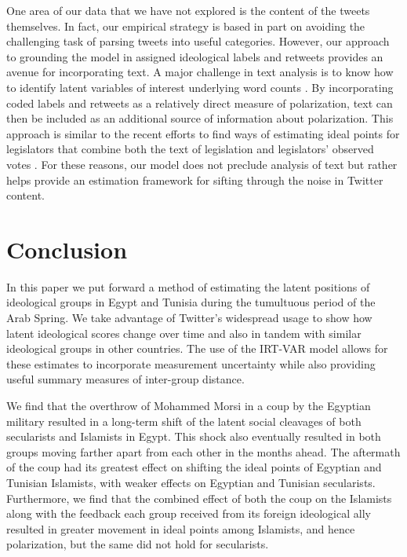 \documentclass[12pt]{article}
\begin{document}
One area of our data that we have not explored is the content of the tweets themselves. In fact, our empirical strategy is based in part on avoiding the challenging task of parsing tweets into useful categories. However, our approach to grounding the model in assigned ideological labels and retweets provides an avenue for incorporating text. A major challenge in text analysis is to know how to identify latent variables of interest underlying word counts \parencite{slapin2008,grimmer2013}. By incorporating coded labels and retweets as a relatively direct measure of polarization, text can then be included as an additional source of information about polarization. This approach is similar to the recent efforts to find ways of estimating ideal points for legislators that combine both the text of legislation and legislators' observed votes \parencite{lauderdale2014}. For these reasons, our model does not preclude analysis of text but rather helps provide an estimation framework for sifting through the noise in Twitter content.

\section*{Conclusion}

In this paper we put forward a method of estimating the latent positions of ideological groups in Egypt and Tunisia during the tumultuous period of the Arab Spring. We take advantage of Twitter's widespread usage to show how latent ideological scores change over time and also in tandem with similar ideological groups in other countries. The use of the IRT-VAR model allows for these estimates to incorporate measurement uncertainty while also providing useful summary measures of inter-group distance.

We find that the overthrow of Mohammed Morsi in a coup by the Egyptian military resulted in a long-term shift of the latent social cleavages of both secularists and Islamists in Egypt. This shock also eventually resulted in both groups moving farther apart from each other in the months ahead. The aftermath of the coup had its greatest effect on shifting the ideal points of Egyptian and Tunisian Islamists, with weaker effects on Egyptian and Tunisian secularists. Furthermore, we find that the combined effect of both the coup on the Islamists along with the feedback each group received from its foreign ideological ally resulted in greater movement in ideal points among Islamists, and hence polarization, but the same did not hold for secularists. 
\end{document}
